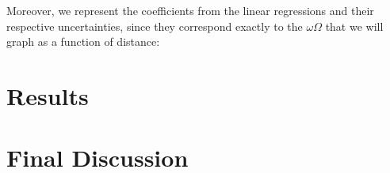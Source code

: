 \documentclass[a4paper,12pt]{article}
\begin{document}
Moreover, we represent the coefficients from the linear regressions and their respective uncertainties, since they correspond exactly to the $\omega \Omega$ that we will graph as a function of distance:

\begin{tabular}
	\centering
	\begin{table}
		
	\end{table}
\end{tabular}

\section{Results}

\section{Final Discussion}
\end{document}
